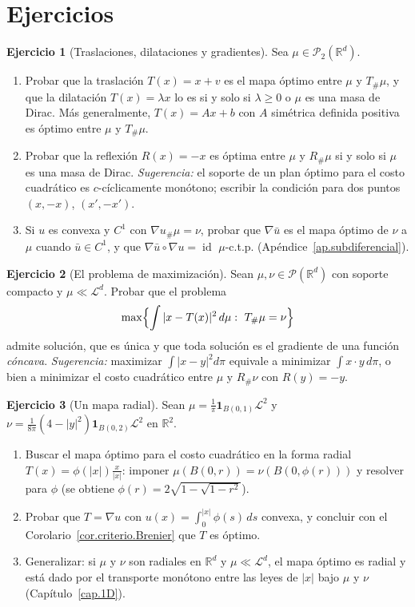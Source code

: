 \documentclass[12pt, a4paper]{amsbook}
\newcommand{\id}{\operatorname{id}}
\newcommand{\R}{{\mathbb R}}
\newcommand{\LL}{{\mathcal L}}
\newcommand{\I}{{\mathbf 1}}
\theoremstyle{remark}
\theoremstyle{definition}
\newtheorem{ejercicio}{Ejercicio}[chapter]
\numberwithin{section}{chapter}
\numberwithin{subsection}{section}
\numberwithin{equation}{section}
\numberwithin{figure}{chapter}
\begin{document}
\section*{Ejercicios}

\begin{ejercicio}[Traslaciones, dilataciones y gradientes]\label{ejer.Brenier.basicos}
Sea $\mu\in\mathcal P_2(\R^d)$.
\begin{enumerate}[label=(\alph*)]
\item Probar que la traslación $T(x)=x+v$ es el mapa óptimo entre $\mu$ y
$T_\#\mu$, y que la dilatación $T(x)=\lambda x$ lo es si y solo si
$\lambda\ge0$ o $\mu$ es una masa de Dirac. Más generalmente, $T(x)=Ax+b$ con
$A$ simétrica definida positiva es óptimo entre $\mu$ y $T_\#\mu$.
\item Probar que la reflexión $R(x)=-x$ es óptima entre $\mu$ y $R_\#\mu$ si
y solo si $\mu$ es una masa de Dirac. \emph{Sugerencia:} el soporte de un
plan óptimo para el costo cuadrático es $c$-cíclicamente monótono; escribir
la condición para dos puntos $(x,-x)$, $(x',-x')$.
\item Si $u$ es convexa y $C^1$ con $\nabla u_\#\mu=\nu$, probar que
$\nabla\bar u$ es el mapa óptimo de $\nu$ a $\mu$ cuando $\bar u\in C^1$, y
que $\nabla\bar u\circ\nabla u=\id$ $\mu$-c.t.p. (Apéndice~\ref{ap.subdiferencial}).
\end{enumerate}
\end{ejercicio}

\begin{ejercicio}[El problema de maximización]\label{ejer.Brenier.maximo}
Sean $\mu,\nu\in\mathcal P(\R^d)$ con soporte compacto y $\mu\ll\LL^d$.
Probar que el problema
\[
\max\Bigl\{\int|x-T(x)|^2\,d\mu:\ T_\#\mu=\nu\Bigr\}
\]
admite solución, que es única y que toda solución es el gradiente de una
función \emph{cóncava}. \emph{Sugerencia:} maximizar $\int|x-y|^2d\pi$
equivale a minimizar $\int x\cdot y\,d\pi$, o bien a minimizar el costo
cuadrático entre $\mu$ y $R_\#\nu$ con $R(y)=-y$.
\end{ejercicio}

\begin{ejercicio}[Un mapa radial]\label{ejer.Brenier.radial}
Sean $\mu=\frac1\pi\I_{B(0,1)}\LL^2$ y $\nu=\frac1{8\pi}(4-|y|^2)\I_{B(0,2)}\LL^2$
en $\R^2$.
\begin{enumerate}[label=(\alph*)]
\item Buscar el mapa óptimo para el costo cuadrático en la forma radial
$T(x)=\phi(|x|)\frac{x}{|x|}$: imponer $\mu(B(0,r))=\nu(B(0,\phi(r)))$ y
resolver para $\phi$ (se obtiene $\phi(r)=2\sqrt{1-\sqrt{1-r^2}}$).
\item Probar que $T=\nabla u$ con $u(x)=\int_0^{|x|}\phi(s)\,ds$ convexa, y
concluir con el Corolario~\ref{cor.criterio.Brenier} que $T$ es óptimo.
\item Generalizar: si $\mu$ y $\nu$ son radiales en $\R^d$ y $\mu\ll\LL^d$,
el mapa óptimo es radial y está dado por el transporte monótono entre las
leyes de $|x|$ bajo $\mu$ y $\nu$ (Capítulo~\ref{cap.1D}).
\end{enumerate}
\end{ejercicio}
\end{document}
